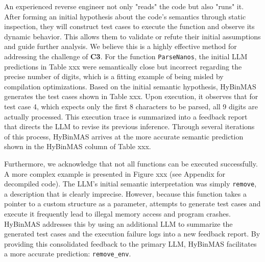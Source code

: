 \documentclass[acmsmall,screen,review,anonymous]{acmart} %
\begin{document}
 An experienced reverse engineer not only "reads" the code but also "runs" it. After forming an initial hypothesis about the code's semantics through static inspection, they will construct test cases to execute the function and observe its dynamic behavior. This allows them to validate or refute their initial assumptions and guide further analysis. We believe this is a highly effective method for addressing the challenge of \textbf{C3}. For the function \lstinline{ParseNanos}, the initial LLM predictions in Table xxx were semantically close but incorrect regarding the precise number of digits, which is a fitting example of being misled by compilation optimizations. Based on the initial semantic hypothesis, HyBinMAS generates the test cases shown in Table xxx. Upon execution, it observes that for test case 4, which expects only the first 8 characters to be parsed, all 9 digits are actually processed. This execution trace is summarized into a feedback report that directs the LLM to revise its previous inference. Through several iterations of this process, HyBinMAS arrives at the more accurate semantic prediction shown in the HyBinMAS column of Table xxx.

Furthermore, we acknowledge that not all functions can be executed successfully. A more complex example is presented in Figure xxx (see Appendix for decompiled code). The LLM's initial semantic interpretation was simply \lstinline{remove}, a description that is clearly imprecise. However, because this function takes a pointer to a custom structure as a parameter, attempts to generate test cases and execute it frequently lead to illegal memory access and program crashes. HyBinMAS addresses this by using an additional LLM to summarize the generated test cases and the execution failure logs into a new feedback report. By providing this consolidated feedback to the primary LLM, HyBinMAS facilitates a more accurate prediction: \lstinline{remove_env}.





\end{document}
